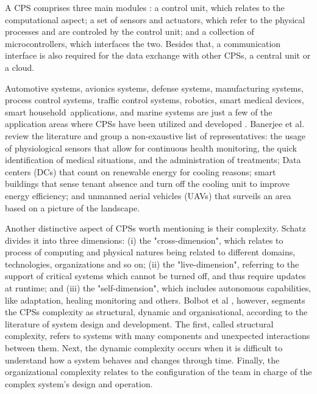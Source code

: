 A CPS comprises three main modules \cite{jazdi2014cyber}: a control unit, which relates to the computational aspect; a set of sensors and actuators, which refer to the physical processes and are controled by the control unit; and a collection of microcontrollers, which interfaces the two. Besides that, a communication interface is also required for the data exchange with other CPSs, a central unit or a cloud. 

Automotive systems, avionics systems, defense systems, manufacturing systems, process control systems, traffic control systems, robotics, smart medical devices, smart household applications, and marine systems are just a few of the application areas where CPSs have been utilized and developed \cite{bolbot2019vulnerabilities}. Banerjee et al. \cite{banerjee2011ensuring} review the literature and group a non-exaustive list of representatives: the usage of physiological sensors that allow for continuous health monitoring, the quick identification of medical situations, and the administration of treatments; Data centers (DCs) that count on renewable energy for cooling reasons; smart buildings that sense tenant absence and turn off the cooling unit to improve energy efficiency; and unmanned aerial vehicles (UAVs) that surveils an area based on a picture of the landscape.

Another distinctive aspect of CPSs worth mentioning is their complexity. Schatz \cite{schatz2014role} divides it into three dimensions: (i) the "cross-dimension", which relates to process of computing and physical natures being related to different domains, technologies, organizations and so on; (ii) the "live-dimension", referring to the support of critical systems which cannot be turned off, and thus require updates at runtime; and (iii) the "self-dimension", which includes autonomous capabilities, like adaptation, healing monitoring and others. Bolbot et al \cite{bolbot2019vulnerabilities}, however, segments the CPSs complexity as structural, dynamic and organisational, according to the literature of system design and development. The first, called structural complexity, refers to systems with many components and unexpected interactions between them. Next, the dynamic complexity occurs when it is difficult to understand how a system behaves and changes through time. Finally, the organizational complexity relates to the configuration of the team in charge of the complex system's design and operation. 



